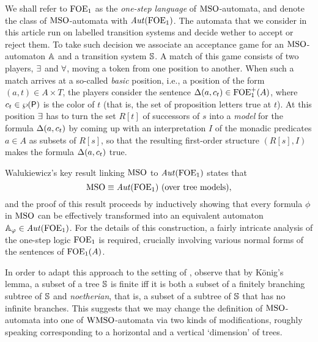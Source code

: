 We shall refer to $\mathrm{FOE}_1$ as the \emph{one-step language} of $\mathrm{MSO}$-automata,
and denote the class of $\mathrm{MSO}$-automata with $\mathit{Aut}(\mathrm{FOE}_1)$.
The automata that we consider in this article run on labelled transition systems
and decide wether to accept or reject them. To take such decision we associate
an acceptance game for an
$\mathrm{MSO}$-automaton $\mathbb{A}$ and a transition system $\mathbb{S}$.
A match of this game consists of two players, $\exists$ and $\forall$, moving a
token from one position to another.
When such a match arrives at a so-called \emph{basic} position, i.e., a
position of the form $(a,t) \in A \times T$, the players consider the
sentence $\Delta(a,c_{t}) \in \mathrm{FOE}_1^+(A)$, where $c_{t} \in \wp(\mathsf{P})$ is the color
of $t$ (that is, the set of proposition letters true at $t$).
At this position $\exists$ has to turn the set $R[t]$ of successors of
$s$ into a \emph{model} for the formula $\Delta(a,c_{t})$ by coming up with an
interpretation $I$ of the monadic predicates $a \in A$ as subsets of $R[s]$,
so that the resulting first-order structure $(R[s],I)$ makes the
formula $\Delta(a,c_{t})$ true.


Walukiewicz's key result linking $\mathrm{MSO}$ to $\mathit{Aut}(\mathrm{FOE}_1)$ states that
\begin{equation}
\mso \equiv \Aut(\ofoe)
 \text{ (over tree models)},
\end{equation}
and the proof of this result proceeds by inductively showing that every formula
$\phi$ in $\mathrm{MSO}$ can be effectively transformed into an equivalent
automaton $\mathbb{A}_{\varphi} \in \mathit{Aut}(\mathrm{FOE}_1)$.
For the details of this construction, a fairly intricate analysis of the
one-step logic $\mathrm{FOE}_1$ is required, crucially involving various normal
forms of the sentences of $\mathrm{FOE}_1(A)$.

In order to adapt this approach to the setting of \wmso, observe that by
K\"onig's lemma, a subset of a tree $\mathbb{S}$ is finite iff it is both a subset of
a finitely branching subtree of $\mathbb{S}$ and \emph{noetherian}, that is, a subset
of a subtree of $\mathbb{S}$ that has no infinite branches.
This suggests that we may change the definition of $\mathrm{MSO}$-automata into one
of $\mathrm{WMSO}$-automata via two kinds of modifications, roughly speaking
corresponding to a horizontal and a vertical `dimension' of trees.

